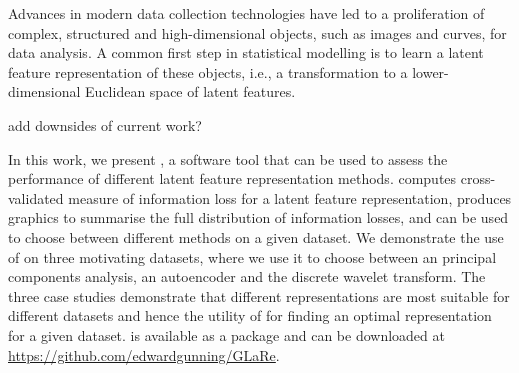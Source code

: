 Advances in modern data collection technologies have led to a proliferation of complex, structured and high-dimensional objects, such as images and curves, for data analysis.
A common first step in statistical modelling is to learn a latent feature representation of these objects, i.e., a transformation to a lower-dimensional Euclidean space of latent features.

{\color{red} add downsides of current work?}

In this work, we present , a software tool that can be used to assess the performance of different latent feature representation methods.
 computes cross-validated measure of information loss for a latent feature representation, produces graphics to summarise the full distribution of information losses, and can be used to choose between different methods on a given dataset.
We demonstrate the use of  on three motivating datasets, where we use it to choose between an principal components analysis, an autoencoder and the discrete wavelet transform.
The three case studies demonstrate that different representations are most suitable for different datasets and hence the utility of  for finding an optimal representation for a given dataset.
 is available as a  package and can be downloaded at \url{https://github.com/edwardgunning/GLaRe}.
